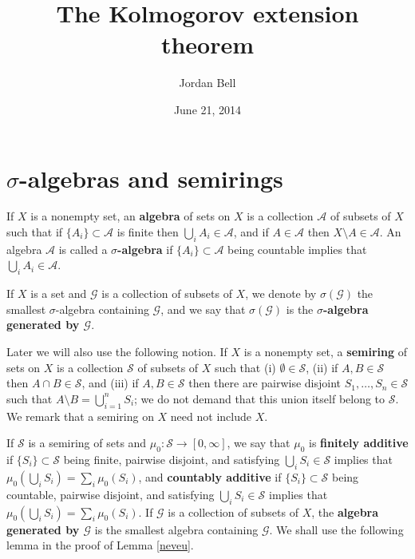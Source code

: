 \documentclass{article}
\theoremstyle{definition}
\begin{document}
\title{The Kolmogorov extension theorem}
\author{Jordan Bell}
\date{June 21, 2014}

\maketitle

\section{$\sigma$-algebras and semirings}
If $X$ is a nonempty set, an \textbf{algebra} of sets on $X$ is a  collection $\mathscr{A}$ of subsets of
$X$ such that if $\{A_i\} \subset \mathscr{A}$ is finite then $\bigcup_i A_i \in \mathscr{A}$,
and if $A \in \mathscr{A}$ then $X \setminus A \in \mathscr{A}$. An algebra
$\mathscr{A}$ is called a \textbf{$\sigma$-algebra} if $\{A_i\} \subset \mathscr{A}$ being countable
implies that $\bigcup_i A_i \in \mathscr{A}$.

If $X$ is a set and  $\mathscr{G}$ is a collection of subsets of $X$,
we denote by $\sigma(\mathscr{G})$ the smallest $\sigma$-algebra containing $\mathscr{G}$, and we say that $\sigma(\mathscr{G})$ is the
\textbf{$\sigma$-algebra generated by $\mathscr{G}$}. 

Later  we will also use the following notion. If $X$ is a nonempty set, a \textbf{semiring} of sets on $X$ is a collection $\mathscr{S}$ of subsets of $X$
such that (i) $\emptyset \in \mathscr{S}$, (ii) if $A,B \in \mathscr{S}$ then $A \cap B \in \mathscr{S}$, and (iii) if $A,B \in \mathscr{S}$ then
there are pairwise disjoint $S_1,\ldots,S_n \in \mathscr{S}$ such that $A \setminus B = \bigcup_{i=1}^n S_i$; we do not demand that this union
itself belong to $\mathscr{S}$. We remark that a semiring on $X$ need not include $X$.

If $\mathscr{S}$ is a semiring of sets and $\mu_0:\mathscr{S} \to [0,\infty]$, we say that $\mu_0$ is
\textbf{finitely additive} if $\{S_i\} \subset \mathscr{S}$ being finite, pairwise disjoint, and satisfying $\bigcup_i S_i \in \mathscr{S}$ 
implies that $\mu_0\left(\bigcup_i S_i \right) = \sum_i \mu_0(S_i)$, and
\textbf{countably additive} if $\{S_i\} \subset \mathscr{S}$ being countable, pairwise disjoint, and satisfying $\bigcup_i S_i \in \mathscr{S}$ 
implies that $\mu_0\left(\bigcup_i S_i \right) = \sum_i \mu_0(S_i)$. 
If $\mathscr{G}$ is a collection of subsets of $X$, 
 the \textbf{algebra generated by $\mathscr{G}$} is the smallest algebra containing $\mathscr{G}$.
We shall use the following lemma in the proof of Lemma \ref{neveu}.
\end{document}
